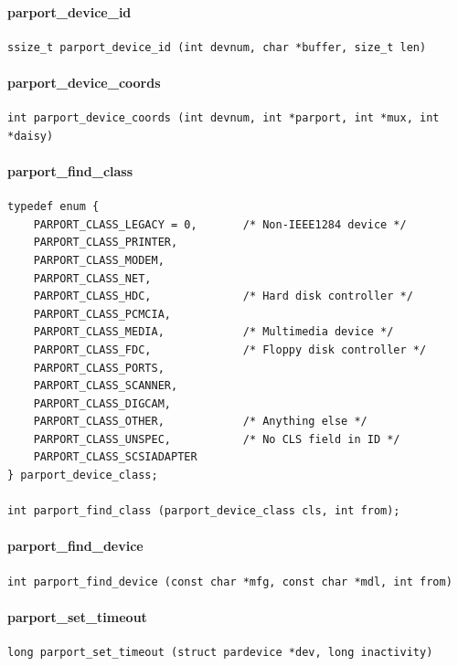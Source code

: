 \documentclass[a4paper,11pt]{article}
\begin{document}
\paragraph{parport\_device\_id}
\begin{verbatim}
ssize_t parport_device_id (int devnum, char *buffer, size_t len)
\end{verbatim}


\paragraph{parport\_device\_coords}
\begin{verbatim}
int parport_device_coords (int devnum, int *parport, int *mux, int *daisy)
\end{verbatim}

\paragraph{parport\_find\_class}
\begin{verbatim}
typedef enum {
	PARPORT_CLASS_LEGACY = 0,       /* Non-IEEE1284 device */
	PARPORT_CLASS_PRINTER,
	PARPORT_CLASS_MODEM,
	PARPORT_CLASS_NET,
	PARPORT_CLASS_HDC,              /* Hard disk controller */
	PARPORT_CLASS_PCMCIA,
	PARPORT_CLASS_MEDIA,            /* Multimedia device */
	PARPORT_CLASS_FDC,              /* Floppy disk controller */
	PARPORT_CLASS_PORTS,
	PARPORT_CLASS_SCANNER,
	PARPORT_CLASS_DIGCAM,
	PARPORT_CLASS_OTHER,            /* Anything else */
	PARPORT_CLASS_UNSPEC,           /* No CLS field in ID */
	PARPORT_CLASS_SCSIADAPTER
} parport_device_class;

int parport_find_class (parport_device_class cls, int from);
\end{verbatim}


\paragraph{parport\_find\_device}
\begin{verbatim}
int parport_find_device (const char *mfg, const char *mdl, int from)
\end{verbatim}


\paragraph{parport\_set\_timeout}
\begin{verbatim}
long parport_set_timeout (struct pardevice *dev, long inactivity)
\end{verbatim}
\end{document}
